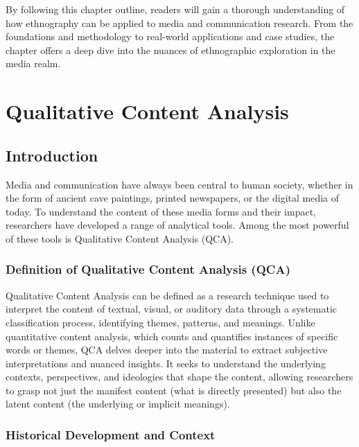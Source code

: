 \documentclass[
  b5paper]{book}
\begin{document}
By following this chapter outline, readers will gain a thorough understanding of how ethnography can be applied to media and communication research. From the foundations and methodology to real-world applications and case studies, the chapter offers a deep dive into the nuances of ethnographic exploration in the media realm.

\hypertarget{qualitative-content-analysis-1}{%
\chapter{Qualitative Content Analysis}\label{qualitative-content-analysis-1}}

\hypertarget{introduction-3}{%
\section{Introduction}\label{introduction-3}}

Media and communication have always been central to human society, whether in the form of ancient cave paintings, printed newspapers, or the digital media of today. To understand the content of these media forms and their impact, researchers have developed a range of analytical tools. Among the most powerful of these tools is Qualitative Content Analysis (QCA).

\hypertarget{definition-of-qualitative-content-analysis-qca}{%
\subsection*{Definition of Qualitative Content Analysis (QCA)}\label{definition-of-qualitative-content-analysis-qca}}

Qualitative Content Analysis can be defined as a research technique used to interpret the content of textual, visual, or auditory data through a systematic classification process, identifying themes, patterns, and meanings. Unlike quantitative content analysis, which counts and quantifies instances of specific words or themes, QCA delves deeper into the material to extract subjective interpretations and nuanced insights. It seeks to understand the underlying contexts, perspectives, and ideologies that shape the content, allowing researchers to grasp not just the manifest content (what is directly presented) but also the latent content (the underlying or implicit meanings).

\hypertarget{historical-development-and-context}{%
\subsection*{Historical Development and Context}\label{historical-development-and-context}}
\end{document}
